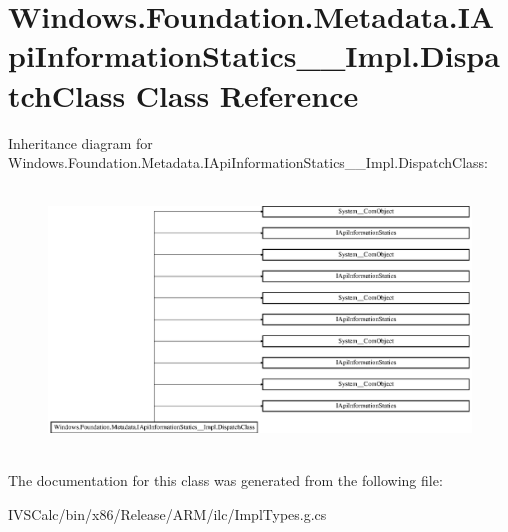 \hypertarget{class_windows_1_1_foundation_1_1_metadata_1_1_i_api_information_statics_____impl_1_1_dispatch_class}{}\section{Windows.\+Foundation.\+Metadata.\+I\+Api\+Information\+Statics\+\_\+\+\_\+\+Impl.\+Dispatch\+Class Class Reference}
\label{class_windows_1_1_foundation_1_1_metadata_1_1_i_api_information_statics_____impl_1_1_dispatch_class}
Inheritance diagram for Windows.\+Foundation.\+Metadata.\+I\+Api\+Information\+Statics\+\_\+\+\_\+\+Impl.\+Dispatch\+Class\+:\begin{figure}[H]
\begin{center}
\leavevmode
\includegraphics[height=7.031963cm]{class_windows_1_1_foundation_1_1_metadata_1_1_i_api_information_statics_____impl_1_1_dispatch_class}
\end{center}
\end{figure}


The documentation for this class was generated from the following file\+:\begin{DoxyCompactItemize}
\item 
I\+V\+S\+Calc/bin/x86/\+Release/\+A\+R\+M/ilc/Impl\+Types.\+g.\+cs\end{DoxyCompactItemize}
